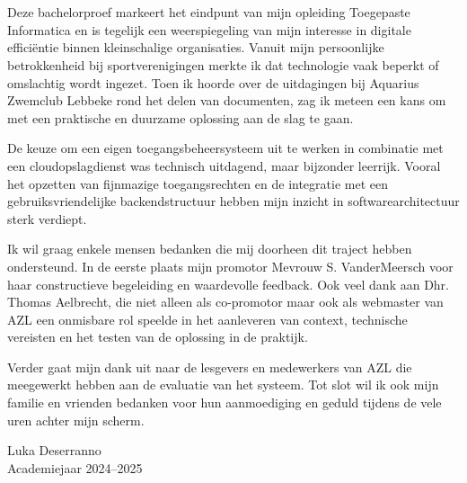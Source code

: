 
\chapter*{}%
\label{ch:voorwoord}

Deze bachelorproef markeert het eindpunt van mijn opleiding Toegepaste Informatica en is tegelijk een weerspiegeling van mijn interesse in digitale efficiëntie binnen kleinschalige organisaties. Vanuit mijn persoonlijke betrokkenheid bij sportverenigingen merkte ik dat technologie vaak beperkt of omslachtig wordt ingezet. Toen ik hoorde over de uitdagingen bij Aquarius Zwemclub Lebbeke rond het delen van documenten, zag ik meteen een kans om met een praktische en duurzame oplossing aan de slag te gaan.

De keuze om een eigen toegangsbeheersysteem uit te werken in combinatie met een cloudopslagdienst was technisch uitdagend, maar bijzonder leerrijk. Vooral het opzetten van fijnmazige toegangsrechten en de integratie met een gebruiksvriendelijke backendstructuur hebben mijn inzicht in softwarearchitectuur sterk verdiept.

Ik wil graag enkele mensen bedanken die mij doorheen dit traject hebben ondersteund. In de eerste plaats mijn promotor Mevrouw S. VanderMeersch voor haar constructieve begeleiding en waardevolle feedback. Ook veel dank aan Dhr. Thomas Aelbrecht, die niet alleen als co-promotor maar ook als webmaster van AZL een onmisbare rol speelde in het aanleveren van context, technische vereisten en het testen van de oplossing in de praktijk.

Verder gaat mijn dank uit naar de lesgevers en medewerkers van AZL die meegewerkt hebben aan de evaluatie van het systeem. Tot slot wil ik ook mijn familie en vrienden bedanken voor hun aanmoediging en geduld tijdens de vele uren achter mijn scherm.

Luka Deserranno \\
Academiejaar 2024–2025
